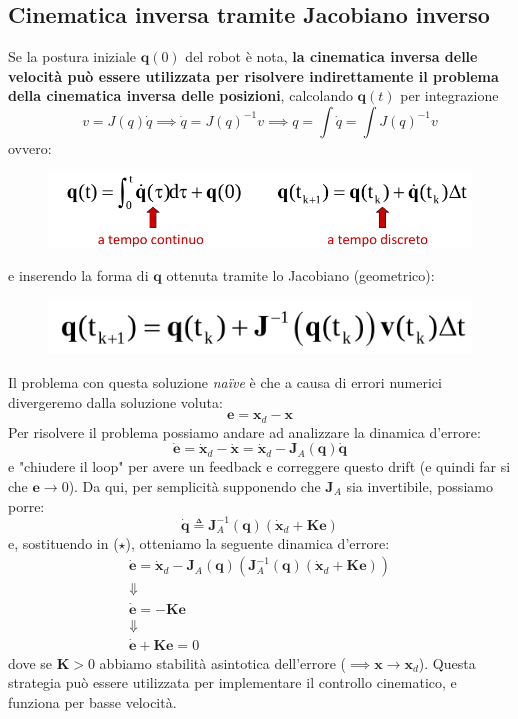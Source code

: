 \subsection[section:invkineinvjac]{Cinematica inversa tramite Jacobiano inverso} \label{section:invkineinvjac}
Se la postura iniziale $\bm{q}(0)$ del robot è nota, \textbf{la cinematica inversa delle velocità può essere utilizzata per risolvere indirettamente il problema della cinematica inversa delle posizioni}, calcolando $\bm{q}(t)$ per integrazione
$$
v = J(q)\dot{q} \implies \dot{q} = J(q)^{-1}v \implies q = \int \dot{q} = \int J(q)^{-1}v
$$
ovvero:
\begin{figure}[H]
	\centering
	\includegraphics[width=0.7\linewidth]{images/diff_kine_11}
	\label{fig:diffkine11}
\end{figure}
e inserendo la forma di $\bm{q}$ ottenuta tramite lo Jacobiano (geometrico):
\begin{figure}[H]
	\centering
	\includegraphics[width=0.4\linewidth]{images/diff_kine_12}
	\label{fig:diffkine12}
\end{figure}

Il problema con questa soluzione \textit{naïve} è che a causa di errori numerici divergeremo dalla soluzione voluta:
\begin{equation}\label{eq:inv_kine_diff_error}
\bm{e} = \bm{x}_d - \bm{x}
\end{equation}
Per risolvere il problema possiamo andare ad analizzare la dinamica d'errore:
\begin{equation*}
\bm{\dot{e}} = \bm{\dot{x}}_d - \bm{\dot{x}} = \bm{\dot{x}}_d - \bm{J}_A(\bm{q})\dot{\bm{q}}
\tag{$\star$}
\end{equation*}
e "chiudere il loop" per avere un feedback e correggere questo drift (e quindi far si che $\bm{e} \to 0$). Da qui, per semplicità supponendo che $\bm{J}_A$ sia invertibile, possiamo porre:
$$
\bm{\dot{q}}
\triangleq
\bm{J}_A^{-1}(\bm{q}) ( \dot{\bm{x}}_d + \bm{K}\bm{e})
$$
e, sostituendo in ($\star$), otteniamo la seguente dinamica d'errore:
\begin{gather*}
\bm{\dot{e}} = \bm{\dot{x}}_d - \bm{J}_A(\bm{q}) ( \bm{J}_A^{-1}(\bm{q}) ( \dot{\bm{x}}_d + \bm{K}\bm{e}) ) \\
\Downarrow \\
\bm{\dot{e}} = -\bm{K}\bm{e} \\
\Downarrow \\
\bm{\dot{e}} + \bm{K}\bm{e} = 0
\end{gather*}
dove se $\bm{K} > 0$ abbiamo stabilità asintotica dell'errore ($\implies \bm{x} \to \bm{x}_d$). Questa strategia può essere utilizzata per implementare il controllo cinematico, e funziona per basse velocità.

